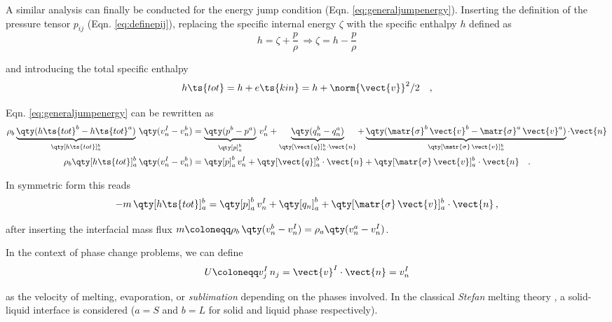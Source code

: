A similar analysis can finally be conducted for the energy jump condition (Eqn. \ref{eq:generaljumpenergy}). Inserting the definition of the pressure tensor $p_{ij}$ (Eqn. \ref{eq:definepij}), replacing the specific internal energy $\zeta$ with the specific enthalpy $h$ defined as 
\begin{equation}
    h = \zeta + \frac{p}{\rho} \, \Rightarrow  \zeta = h - \frac{p}{\rho}
\end{equation}

and introducing the total specific enthalpy
\begin{equation}
   h\ts{tot}=h+e\ts{kin}= h+\norm{\vect{v}}^2/2 \quad ,
\end{equation}

Eqn. \ref{eq:generaljumpenergy} can be rewritten as
\begin{align}
    \rho_b\underbrace{\qty( h\ts{tot}^b - h\ts{tot}^a)}_{\qty[h\ts{tot}]_a^b}\,\qty(v^I_n-v^b_n)
    & = \underbrace{\qty(p^b-p^a)}_{\qty[p]_a^b}\,v^I_n 
    + \underbrace{\qty(q^b_n-q^a_n)}_{\qty[\vect{q}]_a^b\cdot\vect{n}}
    + \underbrace{\qty(\matr{\sigma}^b\,\vect{v}^b
    -\matr{\sigma}^a\,\vect{v}^a)}_{\qty[\matr{\sigma}\,\vect{v}]_a^b}\cdot \vect{n} \notag \\
    \rho_b\qty[h\ts{tot}]_a^b\,\qty(v^I_n-v^b_n)
    &=\qty[p]_a^b\,v^I_n 
    + \qty[\vect{q}]_a^b\cdot\vect{n}
    + \qty[\matr{\sigma}\,\vect{v}]_a^b \cdot \vect{n} \label{eq:energyjumpfinalreview}\quad .
\end{align}

In symmetric form this reads
\begin{equation}
    -m\,\qty[h\ts{tot}]_a^b=\qty[p]_a^b\,v^I_n 
    + \qty[q_n]_a^b
    + \qty[\matr{\sigma}\,\vect{v}]_a^b \cdot \vect{n}\,,
\end{equation}

after inserting the interfacial mass flux $m \coloneqq \rho_b\,\qty(v^b_n-v^I_n) = \rho_a \qty(v^a_n-v^I_n)$.

In the context of phase change problems, we can define
\begin{equation}
    U \coloneqq v_j^I \,n_j = \vect{v}^I \cdot \vect{n} = v^I_n
\end{equation}

as the velocity of melting, evaporation, or \textit{sublimation} depending on the phases involved. In the classical \textit{Stefan} melting theory \cite{stefan1891theorie}, a solid-liquid interface is considered ($a=S$ and $b=L$ for solid and liquid phase respectively). 

